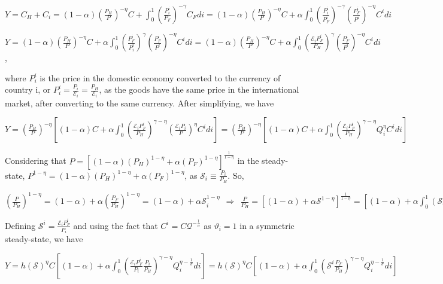 \documentclass[
]{article}
\begin{document}
\(\displaystyle Y=C_H+C_i=(1-\alpha)\left( \frac{P_{H}}{P} \right)^{-\eta}C + \int_0^1 \left( \frac{P_i^i}{P_F} \right)^{-\gamma}C_F di = (1-\alpha)\left( \frac{P_{H}}{P} \right)^{-\eta}C + \alpha \int_0^1 \left( \frac{P_i^i}{P_F^i} \right)^{-\gamma} \left( \frac{P_{F}^i}{P^i} \right)^{-\eta}C^idi\)

\(\displaystyle Y= (1-\alpha)\left( \frac{P_{H}}{P} \right)^{-\eta}C + \alpha \int_0^1 \left( \frac{P_F^i}{P_i^i} \right)^{\gamma} \left( \frac{P_{F}^i}{P^i} \right)^{-\eta}C^idi= (1-\alpha)\left( \frac{P_{H}}{P} \right)^{-\eta}C + \alpha \int_0^1 \left( \frac{\mathcal{E}_i P_F^i }{P_H} \right)^{\gamma} \left( \frac{P_{F}^i}{P^i} \right)^{-\eta}C^idi\),

where \(P_i^i\) is the price in the domestic economy converted to the
currency of country i, or
\(\displaystyle P_i^i = \frac{P_i}{\mathcal{E}_i} = \frac{P_H}{\mathcal{E}_i}\),
as the goods have the same price in the international market, after
converting to the same currency. After simplifying, we have

\(\displaystyle Y = \left( \frac{P_{H}}{P} \right)^{-\eta} \left[ (1-\alpha)C + \alpha \int_0^1 \left( \frac{ \mathcal{E}_i P_F^i }{P_H} \right)^{\gamma-\eta} \left( \frac{\mathcal{E}_i P_i}{P} \right)^\eta C^idi \right] = \left( \frac{P_{H}}{P} \right)^{-\eta} \left[ (1-\alpha)C + \alpha \int_0^1 \left( \frac{ \mathcal{E}_i P_F^i }{P_H} \right)^{\gamma-\eta} Q_i^\eta C^idi \right]\)

Considering that
\(\displaystyle P = \left[ (1-\alpha) \left( P_H \right)^{1-\eta} + \alpha \left( P_F\right)^{1-\eta} \right]^{\frac{1}{1-\eta}}\)
in the steady-state,
\(\displaystyle P^{1-\eta} = (1-\alpha) \left( P_H \right)^{1-\eta} + \alpha \left( P_F \right)^{1-\eta}\),
as \(\displaystyle \mathcal{S}_i \equiv \frac{P_i}{P_H}\). So,

\(\displaystyle \left( \frac{P}{P_H} \right)^{1-\eta} = (1-\alpha) + \alpha \left( \frac{P_F}{P_H}\right)^{1-\eta} = (1-\alpha) + \alpha \mathcal{S}_i^{1-\eta} \ \ \Rightarrow \ \ \frac{P}{P_H}=\left[ (1-\alpha)+\alpha \mathcal{S}^{1-\eta}\right]^{\frac{1}{1-\eta}}= \left[ (1-\alpha) + \alpha \int_0^1(\mathcal{S}_i)^{1-\eta}di \right]^{\frac{1}{1-\eta}} \equiv h(\mathcal{S})\)

Defining
\(\displaystyle \mathcal{S}^i = \frac{\mathcal{E}_i P_F^i}{P_i}\) and
using the fact that
\(\displaystyle C^i=C \mathcal{Q}^{-\frac{1}{\sigma}}\) as
\(\vartheta_i = 1\) in a symmetric steady-state, we have

\(\displaystyle Y = h(\mathcal{S})^{\eta}C \left[ (1-\alpha) + \alpha \int_0^1 \left( \frac{ \mathcal{E}_i P_F^i }{P_i} \frac{P_i}{P_H} \right)^{\gamma-\eta} Q_i^{\eta-\frac{1}{\sigma}} di \right]= h(\mathcal{S})^{\eta}C \left[ (1-\alpha) + \alpha \int_0^1 \left( \mathcal{S}^i \frac{P_F}{P_H} \right)^{\gamma-\eta} Q_i^{\eta-\frac{1}{\sigma}} di \right]\)
\end{document}
